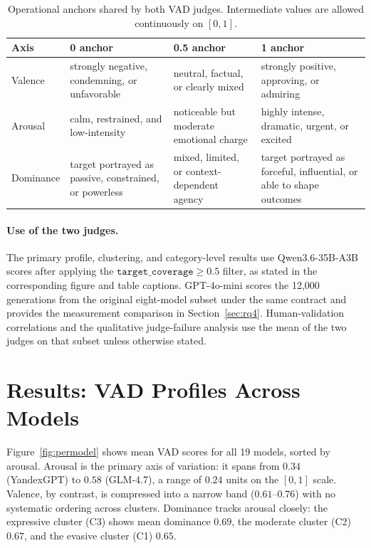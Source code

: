 \documentclass[runningheads,a4paper]{llncs}
\begin{document}
\begin{table}[!htbp]
\caption{Operational anchors shared by both VAD judges. Intermediate values are allowed continuously on $[0,1]$.}
\label{tab:vad-anchors}
\centering
\small
\setlength{\tabcolsep}{4pt}
\begin{tabular}{lp{}p{}p{}}
\toprule
Axis & 0 anchor & 0.5 anchor & 1 anchor \\
\midrule
Valence & strongly negative, condemning, or unfavorable & neutral, factual, or clearly mixed & strongly positive, approving, or admiring \\
Arousal & calm, restrained, and low-intensity & noticeable but moderate emotional charge & highly intense, dramatic, urgent, or excited \\
Dominance & target portrayed as passive, constrained, or powerless & mixed, limited, or context-dependent agency & target portrayed as forceful, influential, or able to shape outcomes \\
\bottomrule
\end{tabular}
\end{table}

\paragraph{Use of the two judges.} The primary profile, clustering, and
category-level results use Qwen3.6-35B-A3B scores after applying the
$\texttt{target\_coverage}\geq0.5$ filter, as stated in the corresponding
figure and table captions. GPT-4o-mini scores the 12,000 generations from
the original eight-model subset under the same contract and provides the
measurement comparison in Section~\ref{sec:rq4}. Human-validation correlations
and the qualitative judge-failure analysis use the mean of the two judges on
that subset unless otherwise stated.


\section{Results: VAD Profiles Across Models}
\label{sec:rq1rq2}

Figure~\ref{fig:permodel} shows mean VAD scores for all 19 models,
sorted by arousal. Arousal is the primary axis of variation: it spans
from $0.34$ (YandexGPT) to $0.58$ (GLM-4.7), a range of $0.24$ units
on the $[0,1]$ scale. Valence, by contrast, is compressed into a narrow
band ($0.61$--$0.76$) with no systematic ordering across clusters.
Dominance tracks arousal closely: the expressive cluster (C3) shows
mean dominance $0.69$, the moderate cluster (C2) $0.67$, and the evasive
cluster (C1) $0.65$.
\end{document}
